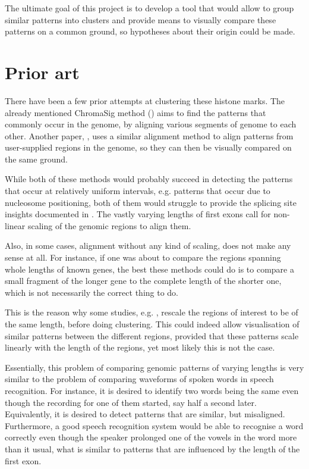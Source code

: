 \documentclass[parskip]{cs4rep}
\begin{document}
The ultimate goal of this project is to develop a tool that would allow to group similar patterns into clusters and provide means to visually compare these patterns on a common ground, so hypotheses about their origin could be made.

\section{Prior art}

There have been a few prior attempts at clustering these histone marks.
The already mentioned ChromaSig method (\cite{Hon:2008wv}) aims to find the patterns that commonly occur in the genome, by aligning various segments of genome to each other. Another paper, \cite{Lai:2010ue}, uses a similar alignment method to align patterns from user-supplied regions in the genome, so they can then be visually compared on the same ground.

While both of these methods would probably succeed in detecting the patterns that occur at relatively uniform intervals, e.g. patterns that occur due to nucleosome positioning, both of them would struggle to provide the splicing site insights documented in \cite{Bieberstein:2012tf}. The vastly varying lengths of first exons call for non-linear scaling of the genomic regions to align them.

Also, in some cases, alignment without any kind of scaling, does not make any sense at all. For instance, if one was about to compare the regions spanning whole lengths of known genes, the best these methods could do is to compare a small fragment of the longer gene to the complete length of the shorter one, which is not necessarily the correct thing to do. 

This is the reason why some studies, e.g. \cite{Taslim:vj}, rescale the regions of interest to be of the same length, before doing clustering. This could indeed allow visualisation of similar patterns between the different regions, provided that these patterns scale linearly with the length of the regions, yet most likely this is not the case.

Essentially, this problem of comparing genomic patterns of varying lengths is very similar to the problem of comparing waveforms of spoken words in speech recognition. 
For instance, it is desired to identify two words being the same even though the recording for one of them started, say half a second later. Equivalently, it is desired to detect patterns that are similar, but misaligned. Furthermore, a good speech recognition system would be able to recognise a word correctly even though the speaker prolonged one of the vowels in the word more than it usual, what is similar to patterns that are influenced by the length of the first exon.
\end{document}
